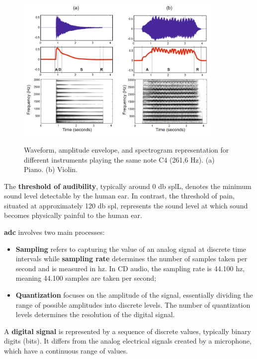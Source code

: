 \begin{figure}[htbp]
    \raggedright
        \caption{Waveform, amplitude envelope, and spectrogram representation for different instruments playing the same note C4 (261,6 Hz). (a) Piano. (b) Violin.}
        \includegraphics[width=0.9\textwidth]{resources/images/030-theoretical_framework/Framework_audio_fund_ADSR.png}
        \label{fig:frmwk_audio_fund_adsr}
\end{figure}

The \textbf{threshold of audibility}, typically around 0 \gls{db} \gls{spl}L, denotes the minimum sound level detectable by the human ear. In contrast, the threshold of pain, situated at approximately 120 \gls{db} \gls{spl}, represents the sound level at which sound becomes physically painful to the human ear. 

\textbf{\gls{adc}} involves two main processes: 
\begin{itemize}
    \item \textbf{Sampling} refers to capturing the value of an analog signal at discrete time intervals while \textbf{sampling rate} determines the number of samples taken per second and is measured in \gls{hz}. In CD audio, the sampling rate is 44.100 \gls{hz}, meaning 44.100 samples are taken per second;
    \item \textbf{Quantization} focuses on the amplitude of the signal, essentially dividing the range of possible amplitudes into discrete levels. The number of quantization levels determines the resolution of the digital signal.
\end{itemize}

A \textbf{digital signal} is represented by a sequence of discrete values, typically binary digits (bits). It differs from the analog electrical signals created by a microphone, which have a continuous range of values.

